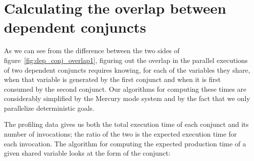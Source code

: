 \section{Calculating the overlap between dependent conjuncts}
\label{sec:overlap}

As we can see from the difference between the two sides of
figure~\ref{fig:dep_conj_overlap1},
figuring out the overlap
in the parallel executions of two dependent conjuncts
requires knowing, for each of the variables they share,
when that variable is generated by the first conjunct and
when it is first consumed by the second conjunct.
Our algorithms for computing these times are considerably simplified
by the Mercury mode system
and by the fact that we only parallelize deterministic goals.

The profiling data gives us both
the total execution time of each conjunct
and its number of invocations;
the ratio of the two is the expected execution time for each invocation.
The algorithm for computing the expected production time
of a given shared variable looks at the form of the conjunct:

